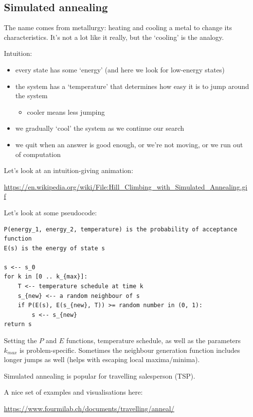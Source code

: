 \documentclass[11pt]{article}
\begin{document}
\subsection{Simulated annealing}

The name comes from metallurgy: heating and cooling a metal to change its characteristics. It's not a lot like it really, but the `cooling' is the analogy.

Intuition:
\begin{itemize}
    \item every state has some `energy' (and here we look for low-energy states)
    \item the system has a `temperature' that determines how easy it is to jump around the system
    \begin{itemize}
        \item cooler means less jumping
    \end{itemize}
    \item we gradually `cool' the system as we continue our search
    \item we quit when an answer is good enough, or we're not moving, or we run out of computation
\end{itemize}

Let's look at an intuition-giving animation:

{\small\url{https://en.wikipedia.org/wiki/File:Hill_Climbing_with_Simulated_Annealing.gif}}

Let's look at some pseudocode:

\begin{verbatim}
P(energy_1, energy_2, temperature) is the probability of acceptance function
E(s) is the energy of state s

s <-- s_0
for k in [0 .. k_{max}]:
    T <-- temperature schedule at time k
    s_{new} <-- a random neighbour of s
    if P(E(s), E(s_{new}, T)) >= random number in (0, 1):
        s <-- s_{new}
return s
\end{verbatim}

Setting the $P$ and $E$ functions, temperature schedule, as well as the parameters $k_{max}$ is problem-specific. Sometimes the neighbour generation function includes longer jumps as well (helps with escaping local maxima/minima).

Simulated annealing is popular for travelling salesperson (TSP).

A nice set of examples and visualisations here:

{\small\url{https://www.fourmilab.ch/documents/travelling/anneal/}}
\end{document}
